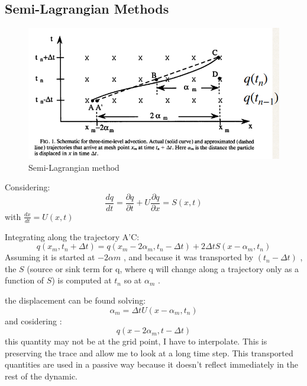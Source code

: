 \subsection{Semi-Lagrangian Methods}
\begin{figure}[h!]
	\centering
	\includegraphics[width=0.5\linewidth]{uploads/Screenshot 2024-11-19 142400.png}
	\caption{Semi-Lagrangian method}
	\label{fig:enter-label}
\end{figure}
Considering:
$$\frac{dq}{dt}=\frac{\partial q}{\partial t}+U\frac{\partial q}{\partial x}=S(x,t)$$
with $\frac{dx}{dt}=U(x,t)$

Integrating along the trajectory A'C:
$$q(x_m,t_n+\Delta t)=q(x_m-2\alpha_m,t_n-\Delta t)+2\Delta tS(x-\alpha_m,t_n)$$
Assuming it is started at $-2\alpha m$ , and because it was transported by $(t_n - \Delta t)$ , the $S$ (source or sink term for q, where q will change along a trajectory only as a function of $S$) is computed at $t_n$ so at $\alpha_m$ .

the displacement can be found solving:
$$\alpha_m=\Delta tU(x-\alpha_m,t_n)$$
and cosidering :
$$q(x-2\alpha_m,t-\Delta t)$$ this quantity may not be at the grid point, I have to interpolate. This is preserving the trace and allow me to look at a long time step. This transported quantities are used in a passive way because it doesn't reflect immediately in the rest of the dynamic.

